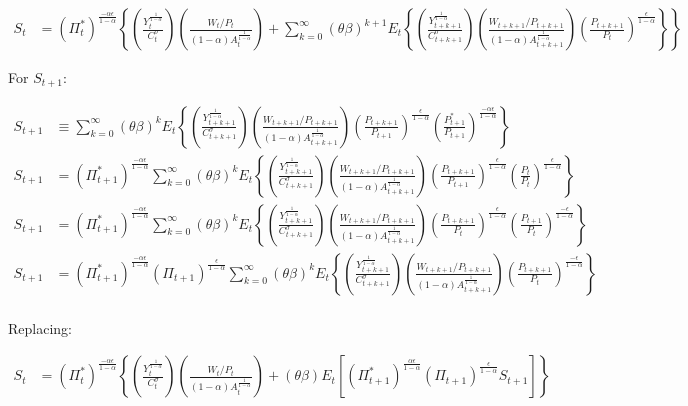 \documentclass[11pt]{article}
\begin{document}
{\scriptsize
\begin{align*}
S_t&=(\Pi_t^*)^{\frac{-\alpha\epsilon}{1-\alpha}}\left\{\left(\frac{Y_{t}^{\frac{1}{1-\alpha}}}{C_{t}^{\sigma}}\right)\left(\frac{W_{t}/P_{t}}{(1-\alpha)A_{t}^{\frac{1}{1-\alpha}}}\right)+\sum_{k=0}^{\infty}(\theta\beta)^{k+1} E_t\left\{ \left(\frac{Y_{t+k+1}^{\frac{1}{1-\alpha}}}{C_{t+k+1}^{\sigma}}\right)\left(\frac{W_{t+k+1}/P_{t+k+1}}{(1-\alpha)A_{t+k+1}^{\frac{1}{1-\alpha}}}\right)\left(\frac{P_{t+k+1}}{P_t}\right)^{\frac{\epsilon}{1-\alpha}}\right\}\right\}
\end{align*}
}

For $S_{t+1}$:

\begin{align*}
S_{t+1}&\equiv\sum_{k=0}^{\infty}(\theta\beta)^k E_t\left\{ \left(\frac{Y_{t+k+1}^{\frac{1}{1-\alpha}}}{C_{t+k+1}^{\sigma}}\right)\left(\frac{W_{t+k+1}/P_{t+k+1}}{(1-\alpha)A_{t+k+1}^{\frac{1}{1-\alpha}}}\right)\left(\frac{P_{t+k+1}}{P_{t+1}}\right)^{\frac{\epsilon}{1-\alpha}}\left(\frac{P_{t+1}^*}{P_{t+1}}\right)^{\frac{-\alpha\epsilon}{1-\alpha}}\right\}\\
S_{t+1}&=(\Pi_{t+1}^*)^{\frac{-\alpha\epsilon}{1-\alpha}}\sum_{k=0}^{\infty}(\theta\beta)^k E_t\left\{ \left(\frac{Y_{t+k+1}^{\frac{1}{1-\alpha}}}{C_{t+k+1}^{\sigma}}\right)\left(\frac{W_{t+k+1}/P_{t+k+1}}{(1-\alpha)A_{t+k+1}^{\frac{1}{1-\alpha}}}\right)\left(\frac{P_{t+k+1}}{P_{t+1}}\right)^{\frac{\epsilon}{1-\alpha}}\left(\frac{P_{t}}{P_{t}}\right)^{\frac{\epsilon}{1-\alpha}}\right\}\\
S_{t+1}&=(\Pi_{t+1}^*)^{\frac{-\alpha\epsilon}{1-\alpha}}\sum_{k=0}^{\infty}(\theta\beta)^k E_t\left\{ \left(\frac{Y_{t+k+1}^{\frac{1}{1-\alpha}}}{C_{t+k+1}^{\sigma}}\right)\left(\frac{W_{t+k+1}/P_{t+k+1}}{(1-\alpha)A_{t+k+1}^{\frac{1}{1-\alpha}}}\right)\left(\frac{P_{t+k+1}}{P_{t}}\right)^{\frac{\epsilon}{1-\alpha}}\left(\frac{P_{t+1}}{P_{t}}\right)^{\frac{-\epsilon}{1-\alpha}}\right\}\\
S_{t+1}&=(\Pi_{t+1}^*)^{\frac{-\alpha\epsilon}{1-\alpha}}(\Pi_{t+1})^{\frac{\epsilon}{1-\alpha}}\sum_{k=0}^{\infty}(\theta\beta)^k E_t\left\{ \left(\frac{Y_{t+k+1}^{\frac{1}{1-\alpha}}}{C_{t+k+1}^{\sigma}}\right)\left(\frac{W_{t+k+1}/P_{t+k+1}}{(1-\alpha)A_{t+k+1}^{\frac{1}{1-\alpha}}}\right)\left(\frac{P_{t+k+1}}{P_{t}}\right)^{\frac{-\epsilon}{1-\alpha}}\right\}\\
\end{align*}

Replacing:

\begin{align*}
S_t&=(\Pi_t^*)^{\frac{-\alpha\epsilon}{1-\alpha}}\left\{\left(\frac{Y_{t}^{\frac{1}{1-\alpha}}}{C_{t}^{\sigma}}\right)\left(\frac{W_{t}/P_{t}}{(1-\alpha)A_{t}^{\frac{1}{1-\alpha}}}\right)+(\theta\beta)E_t[(\Pi_{t+1}^*)^{\frac{\alpha\epsilon}{1-\alpha}}(\Pi_{t+1})^{\frac{\epsilon}{1-\alpha}}S_{t+1}]\right\}
\end{align*}
\end{document}

